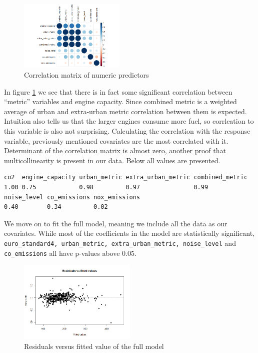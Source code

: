 \documentclass[12pt]{article}
\begin{document}
\begin{figure}[!h]
  \centering
  \includegraphics[width=0.45\textwidth]{project3/corrplot.png}
  \caption{Correlation matrix of numeric predictors}
  \label{fig:corrplot}
\end{figure}
In figure \ref{fig:corrplot} we see that there is in fact some significant correlation between ``metric'' variables and engine capacity.
Since combined metric is a weighted average of urban and extra-urban metric correlation between them is expected. Intuition also
tells us that the larger engines consume more fuel, so corrleation to this variable is also not surprising. Calculating the correlation
with the response variable, previously mentioned covariates are the most correlated with it. Determinant of the correlation matrix is almost zero, another
proof that multicollinearity is present in our data.
Below all values are presented.

\begin{verbatim}
co2  engine_capacity urban_metric extra_urban_metric combined_metric 
1.00 0.75            0.98         0.97               0.99            
noise_level co_emissions nox_emissions 
0.40        0.34         0.02
\end{verbatim}

We move on to fit the full model, meaning we include all the data as our covariates. While most of the coefficients in the model are
statistically significant, \texttt{euro\_standard4, urban\_metric, extra\_urban\_metric, noise\_level} and \texttt{co\_emissions} all have p-values above 0.05.



\begin{figure}
  \centering
  \includegraphics[width=0.5\textwidth]{project3/resVsFit_full.png}
  \caption{Residuals versus fitted value of the full model}
  \label{fig:resVsFit_full}
\end{figure}
\end{document}
